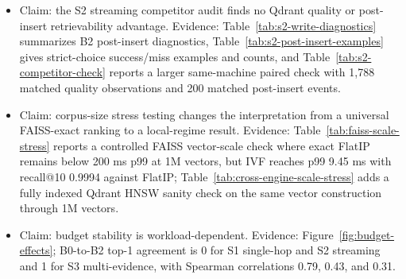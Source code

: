 \begin{itemize}[leftmargin=*]
  \item Claim: the S2 streaming competitor audit finds no Qdrant quality or post-insert retrievability advantage. Evidence: Table~\ref{tab:s2-write-diagnostics} summarizes B2 post-insert diagnostics, Table~\ref{tab:s2-post-insert-examples} gives strict-choice success/miss examples and counts, and Table~\ref{tab:s2-competitor-check} reports a larger same-machine paired check with 1{,}788 matched quality observations and 200 matched post-insert events.
  \item Claim: corpus-size stress testing changes the interpretation from a universal FAISS-exact ranking to a local-regime result. Evidence: Table~\ref{tab:faiss-scale-stress} reports a controlled FAISS vector-scale check where exact FlatIP remains below 200 ms p99 at 1M vectors, but IVF reaches p99 9.45 ms with recall@10 0.9994 against FlatIP; Table~\ref{tab:cross-engine-scale-stress} adds a fully indexed Qdrant HNSW sanity check on the same vector construction through 1M vectors.
  \item Claim: budget stability is workload-dependent. Evidence: Figure~\ref{fig:budget-effects}; B0-to-B2 top-1 agreement is 0 for S1 single-hop and S2 streaming and 1 for S3 multi-evidence, with Spearman correlations 0.79, 0.43, and 0.31.
\end{itemize}

\FloatBarrier
